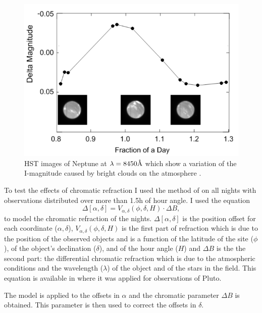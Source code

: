 \documentclass[12pt,a4paper]{report}
\begin{document}
\begin{figure}[h]
\centering
\includegraphics[scale=1]{netuno-day.png}
\caption{HST images of Neptune at $\lambda=8450 \mbox{\normalfont\AA}$ which show a variation of the I-magnitude caused by bright clouds on the atmosphere \citep{Schmude2016}.\label{Fig:netuno-nuvem}}
\end{figure}



To test the effects of chromatic refraction I used the method of \cite{Benedetti-Rossi2014} on all nights with observations distributed over more than 1.5h of hour angle. I used the equation \:
\begin{equation}
\Delta [\alpha, \delta] = V_{\alpha,\delta} (\phi,\delta, H) \cdot \Delta B,
\label{Eq:refraction}
\end{equation}
to model the chromatic refraction of the nights. $\Delta [\alpha, \delta]$ is the position offset for each coordinate ($\alpha, \delta$), $V_{\alpha,\delta} (\phi,\delta, H)$ is the first part of refraction which is due to the position of the observed objects and is a function of the latitude of the site ($\phi$), of the object’s declination ($\delta$), and of the hour angle ($H$) and $\Delta B$ is the the second part: the differential chromatic refraction which is due to the atmospheric conditions and the wavelength ($\lambda$) of the object and of the stars in the field. This equation is available in \cite{Benedetti-Rossi2014} where it was applied for observations of Pluto.

The model is applied to the offsets in $\alpha$ and the chromatic parameter $\Delta B$ is obtained. This parameter is then used to correct the offsets in $\delta$.
\end{document}
